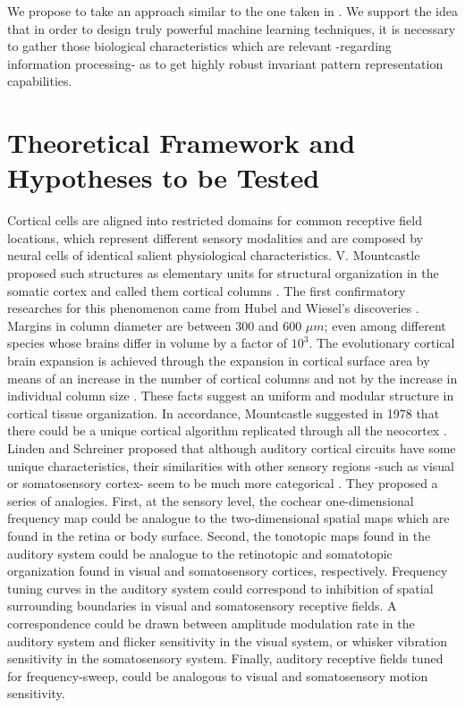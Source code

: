 \documentclass[11pt,a4paper]{article}
\begin{document}
We propose to take an approach similar to the one taken in \cite{hawkins_2016}.
We support the idea that in order to design truly powerful machine
learning techniques,
it is necessary to gather those biological characteristics which are
relevant -regarding information processing- as to get highly
robust invariant pattern representation capabilities. \\













\section{Theoretical Framework and Hypotheses to be Tested}

Cortical cells are aligned into restricted domains for common receptive field locations,
which represent different sensory modalities and are composed by neural cells of identical
salient physiological characteristics.
V. Mountcastle proposed such structures as elementary units for structural organization
in the somatic cortex and called them cortical columns \cite{mountcastle_1955, mountcastle_1957}.
The first confirmatory researches for this phenomenon came from Hubel and Wiesel’s
discoveries \cite{hubel_1962, hubel_1968}.
Margins in column diameter are between 300 and 600 $\mu m$; even
among different species whose brains differ in volume by a factor of $10^3$.
The evolutionary cortical brain expansion is achieved through the expansion in
cortical surface area by means of an increase in the number of cortical columns
and not by the increase in individual column size \cite{rakic_1995}.
These facts suggest an uniform and modular structure in cortical tissue organization.
In accordance, Mountcastle suggested in 1978 that there could be
a unique cortical algorithm replicated through all the neocortex
\cite{mountcastle_1978}.\\

Linden and Schreiner proposed that although auditory
cortical circuits have some unique characteristics,
their similarities with other sensory regions -such as visual or somatosensory cortex-
seem to be much more categorical \cite{linden_2003}.
They proposed a series of analogies.
First, at the sensory level, the cochear one-dimensional frequency map
could be analogue to the two-dimensional spatial maps which are found
in the retina or body surface.
Second, the tonotopic maps found in the auditory system could be analogue to the
retinotopic and somatotopic organization found in visual and somatosensory cortices,
respectively.
Frequency tuning curves in the auditory system could correspond to inhibition of
spatial surrounding boundaries in visual and somatosensory receptive fields.
A correspondence could be drawn between amplitude modulation rate
in the auditory system and flicker sensitivity in the visual system, or
whisker vibration sensitivity in the somatosensory system.
Finally, auditory receptive fields tuned for frequency-sweep, could be
analogous to visual and somatosensory motion sensitivity.\\
\end{document}
